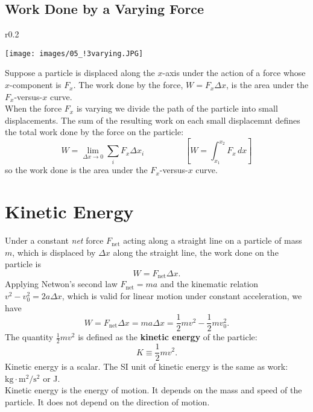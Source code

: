 \documentclass[11pt,a4paper]{report}
\begin{document}
\subsection{Work Done by a Varying Force}

\begin{wrapfigure}{r}{0.2\textwidth}
\begin{center}
\texttt{[image: images/05\_!3varying.JPG]}
\end{center}
\end{wrapfigure}

Suppose a particle is displaced along the $x$-axis under the action of a force whose $x$-component is $F_x$. The work done by the force, $W = F_x \Delta{x}$, is 
the area under the $F_x$-versus-$x$ curve.
\\When the force $F_x$ is varying we divide the path of the particle into small displacements. The sum of the resulting work on each small displacemnt defines the total work done by the force on the particle: $$W = \lim_{\Delta{x} \to 0} \sum_i {F_x \Delta{x_i}} \hspace{2cm} \left[W = \int^{x_2}_{x_1} F_x\,dx\right]$$ so the work done is the area under the $F_x$-versus-$x$ curve.

\section{Kinetic Energy}
Under a constant \textit{net} force $F_\mathrm{net}$ acting along a straight line on a particle of mass $m$, which is displaced by $\Delta{x}$ along the straight line, the work done on the particle is $$W = F_\mathrm{net} \Delta{x}.$$
Applying Netwon's second law $F_\mathrm{net} = ma$ and the kinematic relation $v^2 - v_0^2 = 2a \Delta{x}$, which is valid for linear motion under constant acceleration, we have $$W = F_\mathrm{net} \Delta{x} = ma \Delta{x} = \frac{1}{2} mv^2 - \frac{1}{2} mv_0^2.$$
The quantity $\frac{1}{2} mv^2$ is defined as the \textbf{kinetic energy} of the particle: $$K \equiv \frac{1}{2} mv^2.$$
Kinetic energy is a scalar. The SI unit of kinetic energy is the same as work: $\mathrm{kg} \cdot \mathrm{m}^2 / \mathrm{s}^2$ or J.
\\Kinetic energy is the energy of motion. It depends on the mass and speed of the particle. It does not depend on the direction of motion.
\end{document}
